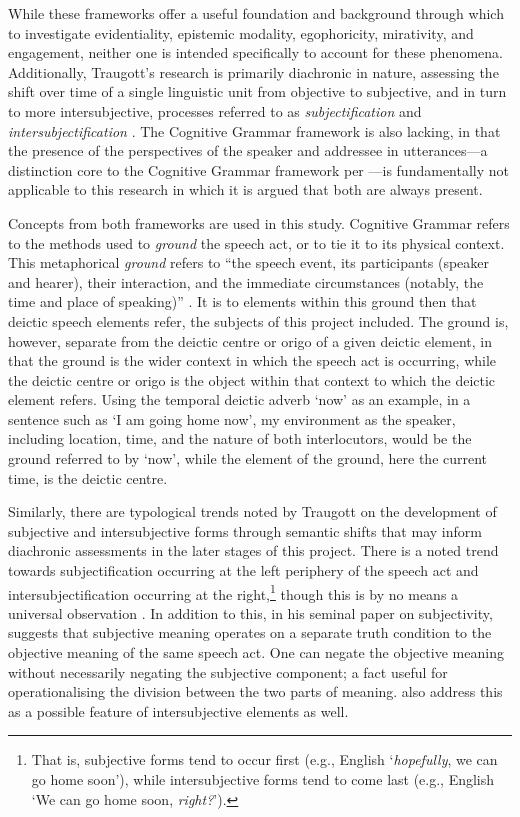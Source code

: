 While these frameworks offer a useful foundation and background through which to investigate evidentiality, epistemic modality, egophoricity, mirativity, and engagement, neither one is intended specifically to account for these phenomena. Additionally, Traugott's research is primarily diachronic in nature, assessing the shift over time of a single linguistic unit from objective to subjective, and in turn to more intersubjective, processes referred to as \textit{subjectification} and \textit{intersubjectification} \cites{Traugott1995}{Traugott2014}. The Cognitive Grammar framework is also lacking, in that the presence of the perspectives of the speaker and addressee in utterances---a distinction core to the Cognitive Grammar framework per ---is fundamentally not applicable to this research in which it is argued that both are always present.

Concepts from both frameworks are used in this study. Cognitive Grammar refers to the methods used to \textit{ground} the speech act, or to tie it to its physical context. This metaphorical \textit{ground} refers to ``the speech event, its participants (speaker and hearer), their interaction, and the immediate circumstances (notably, the time and place of speaking)'' \cite[259]{Langacker2008}. It is to elements within this ground then that deictic speech elements refer, the subjects of this project included. The ground is, however, separate from the deictic centre or origo of a given deictic element, in that the ground is the wider context in which the speech act is occurring, while the deictic centre or origo is the object within that context to which the deictic element refers. Using the temporal deictic adverb `now' as an example, in a sentence such as `I am going home now', my environment as the speaker, including location, time, and the nature of both interlocutors, would be the ground referred to by `now', while the element of the ground, here the current time, is the deictic centre.

Similarly, there are typological trends noted by Traugott on the development of subjective and intersubjective forms through semantic shifts that may inform diachronic assessments in the later stages of this project. There is a noted trend towards subjectification occurring at the left periphery of the speech act and intersubjectification occurring at the right,\footnote{That is, subjective forms tend to occur first (e.g., English `\textit{hopefully}, we can go home soon'), while intersubjective forms tend to come last (e.g., English `We can go home soon, \textit{right?}').} though this is by no means a universal observation \cite{Traugott2014}. In addition to this, in his seminal paper on subjectivity,  suggests that subjective meaning operates on a separate truth condition to the objective meaning of the same speech act. One can negate the objective meaning without necessarily negating the subjective component; a fact useful for operationalising the division between the two parts of meaning.  also address this as a possible feature of intersubjective elements as well.

